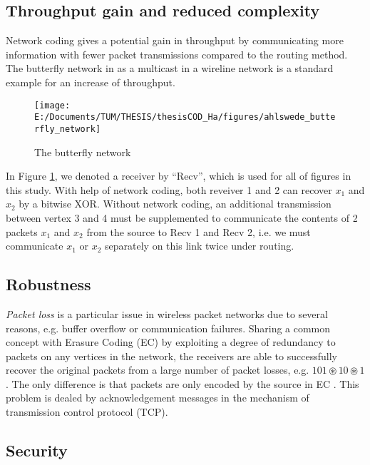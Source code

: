 \subsection{Throughput gain and reduced complexity}

Network coding gives a potential gain in throughput by communicating
more information with fewer packet transmissions compared to the routing
method. The butterfly network in \cite{Ahlswede:2000} as a multicast
in a wireline network is a standard example for an increase of throughput. 

\begin{figure}[H]
\caption{The butterfly network \label{fig:The-butterfly-network}}

\texttt{[image: E:/Documents/TUM/THESIS/thesisCOD\_Ha/figures/ahlswede\_butterfly\_network]}
\end{figure}

In Figure \ref{fig:The-butterfly-network}, we denoted a receiver
by ``Recv'', which is used for all of figures in this study. With
help of network coding, both reveiver 1 and 2 can recover $x_{1}$
and $x_{2}$ by a bitwise XOR. Without network coding, an additional
transmission between vertex 3 and 4 must be supplemented to communicate
the contents of 2 packets $x_{1}$ and $x_{2}$ from the source to
Recv 1 and Recv 2, i.e. we must communicate $x_{1}$ or $x_{2}$ separately
on this link twice under routing. 

\subsection{Robustness}

\textit{Packet loss} is a particular issue in wireless packet networks
due to several reasons, e.g. buffer overflow or communication failures.
Sharing a common concept with Erasure Coding (EC) by exploiting a
degree of redundancy to packets on any vertices in the network, the
receivers are able to successfully recover the original packets from
a large number of packet losses, e.g. $101\circledast10\circledast1$.
The only difference is that packets are only encoded by the source
in EC \cite{Fujimura:2008}. This problem is dealed by acknowledgement
messages in the mechanism of transmission control protocol (TCP).

\subsection{Security}

